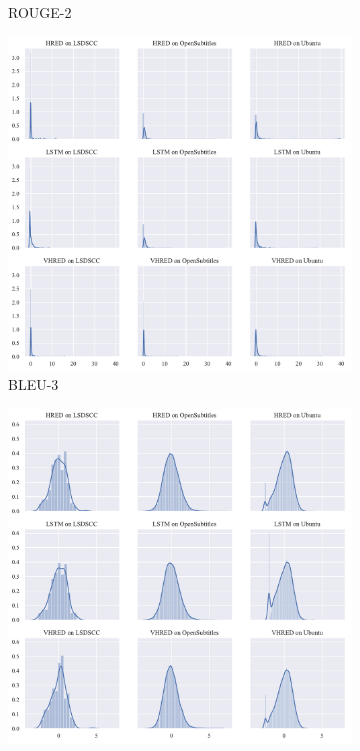 \begin{figure}[H]
\begin{subfigure}{0.33\linewidth}
        \caption{ROUGE-2}
    \end{subfigure}
    \begin{subfigure}{0.33\linewidth}
        \centering
        \includegraphics[width=\linewidth]{figure/distplot_grid/bleu_3/plot.pdf}
        \caption{BLEU-3}
    \end{subfigure}%
    \begin{subfigure}{0.33\linewidth}
        \includegraphics[width=\linewidth]{figure/distplot_grid/embedding_based_greedy_matching/plot.pdf}

\end{subfigure}
\end{figure}
